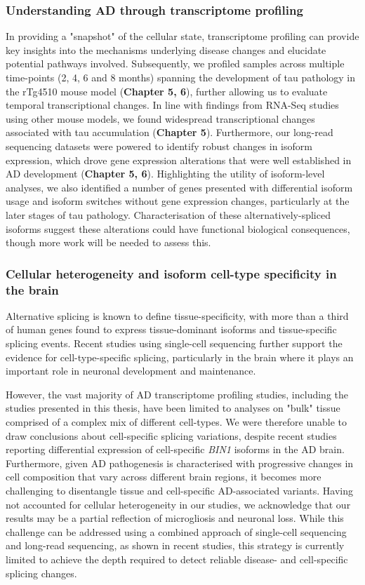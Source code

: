 \subsubsection{Understanding AD through transcriptome profiling}
In providing a "snapshot" of the cellular state, transcriptome profiling can provide key insights into the mechanisms underlying disease changes and elucidate potential pathways involved. Subsequently, we profiled samples across multiple time-points (2, 4, 6 and 8 months) spanning the development of tau pathology in the rTg4510 mouse model (\textbf{Chapter 5, 6}), further allowing us to evaluate temporal transcriptional changes. In line with findings from RNA-Seq studies using other mouse models, we found widespread transcriptional changes associated with tau accumulation (\textbf{Chapter 5}). Furthermore, our long-read sequencing datasets were powered to identify robust changes in isoform expression, which drove gene expression alterations that were well established in AD development (\textbf{Chapter 5, 6}). Highlighting the utility of isoform-level analyses, we also identified a number of genes presented with differential isoform usage and isoform switches without gene expression changes, particularly at the later stages of tau pathology. Characterisation of these alternatively-spliced isoforms suggest these alterations could have functional biological consequences, though more work will be needed to assess this.   

\subsubsection{Cellular heterogeneity and isoform cell-type specificity in the brain}
Alternative splicing is known to define tissue-specificity, with more than a third of human genes found to express tissue-dominant isoforms and tissue-specific splicing events. Recent studies using single-cell sequencing further support the evidence for cell-type-specific splicing, particularly in the brain where it plays an important role in neuronal development and maintenance.

However, the vast majority of AD transcriptome profiling studies, including the studies presented in this thesis, have been limited to analyses on "bulk" tissue comprised of a complex mix of different cell-types. We were therefore unable to draw conclusions about cell-specific splicing variations, despite recent studies reporting differential expression of cell-specific \textit{BIN1} isoforms in the AD brain. Furthermore, given AD pathogenesis is characterised with progressive changes in cell composition that vary across different brain regions, it becomes more challenging to disentangle tissue and cell-specific AD-associated variants. Having not accounted for cellular heterogeneity in our studies, we acknowledge that our results may be a partial reflection of microgliosis and neuronal loss. While this challenge can be addressed using a combined approach of single-cell sequencing and long-read sequencing, as shown in recent studies, this strategy is currently limited to achieve the depth required to detect reliable disease- and cell-specific splicing changes. 
 
